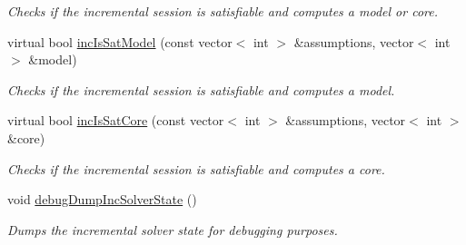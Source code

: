 \begin{DoxyCompactItemize}
\begin{DoxyCompactList}\small\item\em Checks if the incremental session is satisfiable and computes a model or core. \end{DoxyCompactList}\item 
virtual bool \hyperlink{classDepQBFApi_a218feb52145bd715dc07fa2b765662f4}{inc\-Is\-Sat\-Model} (const vector$<$ int $>$ \&assumptions, vector$<$ int $>$ \&model)
\begin{DoxyCompactList}\small\item\em Checks if the incremental session is satisfiable and computes a model. \end{DoxyCompactList}\item 
virtual bool \hyperlink{classDepQBFApi_a4290fa5559f2ba9663bdb158c384cc92}{inc\-Is\-Sat\-Core} (const vector$<$ int $>$ \&assumptions, vector$<$ int $>$ \&core)
\begin{DoxyCompactList}\small\item\em Checks if the incremental session is satisfiable and computes a core. \end{DoxyCompactList}\item 
void \hyperlink{classDepQBFApi_ae90857fc6480bec580154f878731f740}{debug\-Dump\-Inc\-Solver\-State} ()
\begin{DoxyCompactList}\small\item\em Dumps the incremental solver state for debugging purposes. \end{DoxyCompactList}\end{DoxyCompactItemize}
